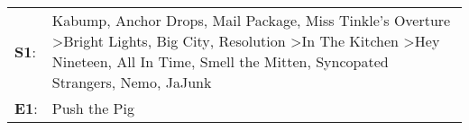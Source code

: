 \begin{supertabular}{p{0.03\textwidth}p{0.92\textwidth}}
 \textbf{S1}:  &  Kabump\textsuperscript{}, \enspace Anchor Drops\textsuperscript{}, \enspace Mail Package\textsuperscript{}, \enspace Miss Tinkle's Overture\textsuperscript{} \textgreater \enspace Bright Lights, Big City\textsuperscript{}, \enspace Resolution\textsuperscript{} \textgreater \enspace In The Kitchen\textsuperscript{} \textgreater \enspace Hey Nineteen\textsuperscript{}, \enspace All In Time\textsuperscript{}, \enspace Smell the Mitten\textsuperscript{}, \enspace Syncopated Strangers\textsuperscript{}, \enspace Nemo\textsuperscript{}, \enspace JaJunk\textsuperscript{}  \enspace  \\
 \textbf{E1}:  &                                                                                                                                                                                                                                                                                                                                                                                                                                                                                                                                                              Push the Pig\textsuperscript{}  \enspace  \\
\end{supertabular}
